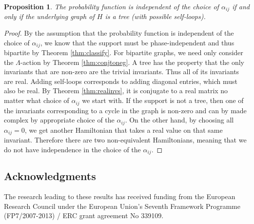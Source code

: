 \documentclass[twocolumn,superscriptaddress]{revtex4-1}
\theoremstyle{plain}
\newtheorem{proposition}[theorem]{Proposition}
\theoremstyle{definition}
\theoremstyle{definition}
\theoremstyle{definition}
\theoremstyle{definition}
\theoremstyle{definition}
\theoremstyle{definition}
\begin{document}
\begin{proposition}
 The probability function is independent of the choice of $\alpha_{ij}$ if and only if the underlying graph of $H$ is a tree (with possible self-loops).
\end{proposition}
\begin{proof}
 By the assumption that the probability function is independent of the choice of $\alpha_{ij}$, we know that the support must be phase-independent and thus bipartite by Theorem \ref{thm:classify}. For bipartite graphs, we need only consider the $\Lambda$-action by Theorem \ref{thm:conjtoneg}.  A tree has the property that the only invariants that are non-zero are the trivial invariants. Thus all of its invariants are real. Adding self-loops corresponds to adding diagonal entries, which must also be real. By Theorem \ref{thm:realinvs}, it is conjugate to a real matrix no matter what choice of $\alpha_{ij}$ we start with. If the support is not a tree, then one of the invariants corresponding to a cycle in the graph is non-zero and can by made complex by appropriate choice of the $\alpha_{ij}$. On the other hand, by choosing all $\alpha_{ij}=0$, we get another Hamiltonian that takes a real value on that same invariant. Therefore there are two non-equivalent Hamiltonians, meaning that we do not have independence 
in the choice of the $\alpha_{ij}$.
\end{proof}



\subsection*{Acknowledgments} The research leading to these results has received funding from the European Research Council under the European Union's Seventh Framework Programme (FP7/2007-2013) / ERC grant agreement No 339109.

 
\end{document}
